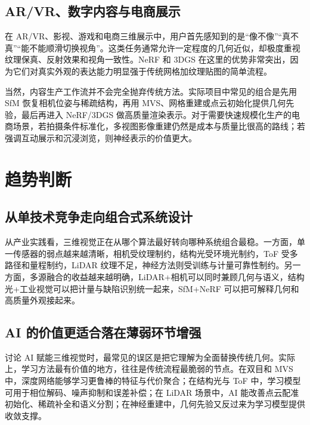 \documentclass[12pt,a4paper]{ctexart}
\begin{document}
\subsection{AR/VR、数字内容与电商展示}

在 AR/VR、影视、游戏和电商三维展示中，用户首先感知到的是“像不像”\hspace{0.2em}“真不真”\hspace{0.2em}“能不能顺滑切换视角”。这类任务通常允许一定程度的几何近似，却极度重视纹理保真、反射效果和视角一致性。NeRF 和 3DGS 在这里的优势非常突出，因为它们对真实外观的表达能力明显强于传统网格加纹理贴图的简单流程。\cite{mildenhall2020nerf,kerbl2023gaussian}

当然，内容生产工作流并不会完全抛弃传统方法。实际项目中常见的组合是先用 SfM 恢复相机位姿与稀疏结构，再用 MVS、网格重建或点云初始化提供几何先验，最后再进入 NeRF/3DGS 做高质量渲染表示。对于需要快速规模化生产的电商场景，若拍摄条件标准化，多视图影像重建仍然是成本与质量比很高的路线；若强调互动展示和沉浸浏览，则神经表示的价值更大。

\section{趋势判断}

\subsection{从单技术竞争走向组合式系统设计}

从产业实践看，三维视觉正在从哪个算法最好转向哪种系统组合最稳。一方面，单一传感器的弱点越来越清晰，相机受纹理制约，结构光受环境光制约，ToF 受多路径和量程制约，LiDAR 纹理不足，神经方法则受训练与计量可靠性制约。另一方面，多源融合的收益越来越明确，LiDAR+相机可以同时兼顾几何与语义，结构光+工业视觉可以把计量与缺陷识别统一起来，SfM+NeRF 可以把可解释几何和高质量外观接起来。

\subsection{AI 的价值更适合落在薄弱环节增强}

讨论 AI 赋能三维视觉时，最常见的误区是把它理解为全面替换传统几何。实际上，学习方法最有价值的地方，往往是传统流程最脆弱的节点。在双目和 MVS 中，深度网络能够学习更鲁棒的特征与代价聚合；在结构光与 ToF 中，学习模型可用于相位解码、噪声抑制和误差补偿；在 LiDAR 场景中，AI 能改善点云配准初始化、稀疏补全和语义分割；在神经重建中，几何先验又反过来为学习模型提供收敛支撑。\cite{yao2018mvsnet,he2017toferror,kerbl2023gaussian}
\end{document}
